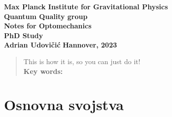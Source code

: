\documentclass[12pt]{article}
\begin{document}
\begin{titlepage}
	\begin{center}
		{\large \textbf{Max Planck Institute for Gravitational Physics}} \\[0.1cm]
		{\large \textbf{Quantum Quality group}}\\[0.1cm]
		{\large \textbf{Notes for Optomechanics}} \\[0.1cm]
		{\LARGE\textbf{PhD Study}}\\[2.5cm]
		\vspace{2cm}
		{\LARGE \textbf{Adrian Udovičić}}
		\vfill
		\large\textbf{{Hannover, 2023} }
	\end{center}
\end{titlepage}


\newpage
{}
\begin{abstract}
	This is how it is, so you can just do it!\\
	\textbf{Key words:}
\end{abstract}
\newpage
\tableofcontents
\newpage

\section{Osnovna svojstva}

\end{document}
